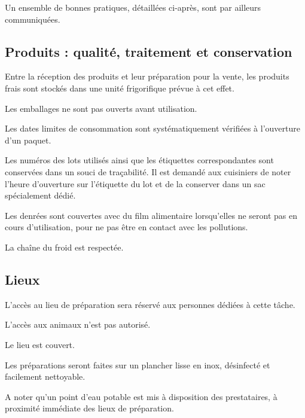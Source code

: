 \documentclass[hidelinks, paper=a4, fontsize=13pt]{report}
\begin{document}
Un ensemble de bonnes pratiques, détaillées ci-après, sont par ailleurs communiquées.

\subsection{Produits : qualité, traitement et conservation}

\begin{list}{•}{}
	\item Entre la réception des produits et leur préparation pour la vente, les produits frais sont stockés dans une unité frigorifique prévue à cet effet.
	\item Les emballages ne sont pas ouverts avant utilisation.
	\item Les dates limites de consommation sont systématiquement vérifiées à l’ouverture d’un paquet.
	\item Les numéros des lots utilisés ainsi que les étiquettes correspondantes sont conservées dans un souci de traçabilité. Il est demandé aux cuisiniers de noter l’heure d’ouverture sur l’étiquette du lot et de la conserver dans un sac spécialement dédié.
	\item Les denrées sont couvertes avec du film alimentaire lorsqu’elles ne seront pas en cours d’utilisation, pour ne pas être en contact avec les pollutions.
	\item La chaîne du froid est respectée.
\end{list}

\subsection{Lieux}

\begin{list}{•}{}
	\item L’accès au lieu de préparation sera réservé aux personnes dédiées à cette tâche.
	\item L’accès aux animaux n’est pas autorisé.
	\item Le lieu est couvert.
	\item Les préparations seront faites sur un plancher lisse en inox, désinfecté et facilement nettoyable. %
\end{list}

A noter qu'un point d'eau potable est mis à disposition des prestataires, à proximité immédiate des lieux de préparation.
\end{document}
